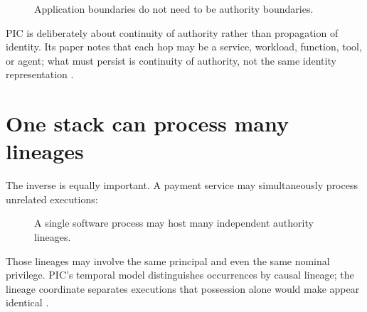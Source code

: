 \documentclass[10pt,oneside,openany]{book}
\begin{document}
\begin{figure}[ht]
\centering
{}
\caption{Application boundaries do not need to be authority boundaries.}
\end{figure}

PIC is deliberately about continuity of authority rather than propagation of identity. Its paper notes that each hop may be a service, workload, function, tool, or agent; what must persist is continuity of authority, not the same identity representation \cite{gallo2026pic}.

\section{One stack can process many lineages}
The inverse is equally important. A payment service may simultaneously process unrelated executions:

\begin{figure}[ht]
\centering
{}
\caption{A single software process may host many independent authority lineages.}
\end{figure}

Those lineages may involve the same principal and even the same nominal privilege. PIC's temporal model distinguishes occurrences by causal lineage; the lineage coordinate separates executions that possession alone would make appear identical \cite{gallo2026pic}.
\end{document}
